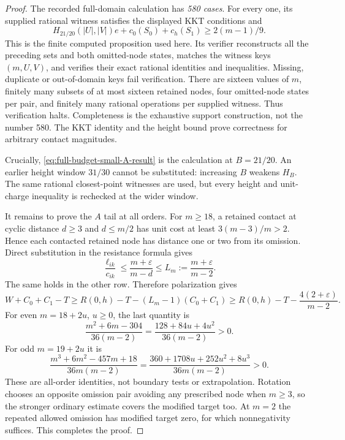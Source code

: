 \documentclass[11pt]{article}
\theoremstyle{remark}\newtheorem{remark}[theorem]{Remark}
\begin{document}
\begin{proof}
The recorded full-domain calculation has \emph{580 cases}. For every
one, its supplied rational witness satisfies the displayed KKT
conditions and
\begin{equation}\label{eq:full-budget-small-A-result}
 H_{21/20}(|U|,|V|)e+c_0(S_0)+c_h(S_1)\ge2(m-1)/9.
\end{equation}
This is the finite computed proposition used here. Its verifier
reconstructs all the preceding sets and both omitted-node states,
matches the witness keys $(m,U,V)$, and verifies their exact rational
identities and inequalities. Missing, duplicate or out-of-domain
keys fail verification. There are sixteen values of $m$, finitely
many subsets of at most sixteen retained nodes, four omitted-node
states per pair, and finitely many rational operations per supplied
witness. Thus verification halts. Completeness is the exhaustive
support construction, not the number 580. The KKT identity and the
height bound prove correctness for arbitrary contact magnitudes.

Crucially, \eqref{eq:full-budget-small-A-result} is the calculation
at $B=21/20$. An earlier height window $31/30$ cannot be substituted:
increasing $B$ weakens $H_B$. The same rational closest-point
witnesses are used, but every height and unit-charge inequality is
rechecked at the wider window.

It remains to prove the $A$ tail at all orders. For $m\ge18$, a
retained contact at cyclic distance $d\ge3$ and $d\le m/2$ has
unit cost at least $3(m-3)/m>2$. Hence each contacted retained node
has distance one or two from its omission. Direct substitution in
the resistance formula gives
\[
 \frac{\ell_{ik}}{c_{ik}}
 \le\frac{m+\varepsilon}{m-d}
 \le L_m:=\frac{m+\varepsilon}{m-2}.
\]
The same holds in the other row. Therefore polarization gives
\[
 W+C_0+C_1-T
 \ge R(0,h)-T-(L_m-1)(C_0+C_1)
 \ge R(0,h)-T-\frac{4(2+\varepsilon)}{m-2}.
\]
For even $m=18+2u$, $u\ge0$, the last quantity is
\[
 \frac{m^2+6m-304}{36(m-2)}
 =\frac{128+84u+4u^2}{36(m-2)}>0.
\]
For odd $m=19+2u$ it is
\[
 \frac{m^3+6m^2-457m+18}{36m(m-2)}
 =\frac{360+1708u+252u^2+8u^3}{36m(m-2)}>0.
\]
These are all-order identities, not boundary tests or extrapolation.
Rotation chooses an opposite omission pair avoiding any prescribed
node when $m\ge3$, so the stronger ordinary estimate covers the
modified target too. At $m=2$ the repeated allowed omission has
modified target zero, for which nonnegativity suffices. This
completes the proof.
\end{proof}
\end{document}
